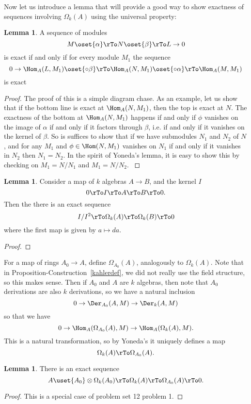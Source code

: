 \documentclass[12 pt]{article}
\theoremstyle{definition}
\newtheorem{lemma}[theorem]{Lemma}
\begin{document}
Now let us introduce a lemma that will provide a good way to show exactness of sequences involving $\Omega_k(A)$ using the universal property:
\begin{lemma} A sequence of modules
\[M \oset{\alpha}\rTo N \oset{\beta}\rTo L \to 0\]
is exact if and only if for every module $M_1$ the sequence
\[0 \to \Hom_A(L,M_1) \oset{\circ \beta}\rTo \Hom_A(N, M_1) \oset{\circ \alpha}\rTo \Hom_A(M,M_1)\]
is exact
\end{lemma}
\begin{proof}
The proof of this is a simple diagram chase. As an example, let us show that if the bottom line is exact at $\Hom_A(N,M_1)$, then the top is exact at $N$. The exactness of the bottom at $\Hom_A(N,M_1)$ happens if and only if $\phi$ vanishes on the image of $\alpha$ if and only if it factors through $\beta$, i.e. if and only if it vanishes on the kernel of $\beta$. So is suffices to show that if we have submodules $N_1$ and $N_2$ of $N$, and for any $M_1$ and $\phi \in \Hom(N,M_1)$ vanishes on $N_1$ if and only if it vanishes in $N_2$ then $N_1=N_2$. In the spirit of Yoneda's lemma, it is easy to show this by checking on $M_1=N/N_1$ and $M_1=N/N_2$.
\label{homveryleftexact}
\end{proof}


\begin{lemma} Consider a map of $k$ algebras $A \to B$, and the kernel $I$
\[0 \rTo I \rTo A \rTo B \rTo 0.\]
Then the there is an exact sequence
\[I/I^2 \rTo \Omega_k(A) \rTo \Omega_k(B) \rTo 0\]
where the first map is given by $a \mapsto da$.
\end{lemma}
\begin{proof}
\end{proof}

For a map of rings $A_0 \to A$, define $\Omega_{A_0}(A)$, analogously to $\Omega_k(A)$. Note that in Proposition-Construction~\ref{kahlerdef}, we did not really use the field structure, so this makes sense. Then if $A_0$ and $A$ are $k$ algebras, then note that $A_0$ derivations are also $k$ derivations, so we have a natural inclusion
\[0 \to \Der_{A_0}(A,M) \to \Der_k(A,M)\]
so that we have
\[0 \to \Hom_A(\Omega_{A_0}(A),M) \to \Hom_A(\Omega_k(A),M).\]
This is a natural transformation, so by Yoneda's it uniquely defines a map
\[\Omega_k(A) \rTo \Omega_{A_0}(A).\]



\begin{lemma} There is an exact sequence
\[A \uset{A_0}\otimes \Omega_k(A_0) \rTo \Omega_k(A) \rTo \Omega_{A_0}(A) \rTo 0.\]
\end{lemma}
\begin{proof} This is a special case of problem set 12 problem 1.
\end{proof}
\end{document}
